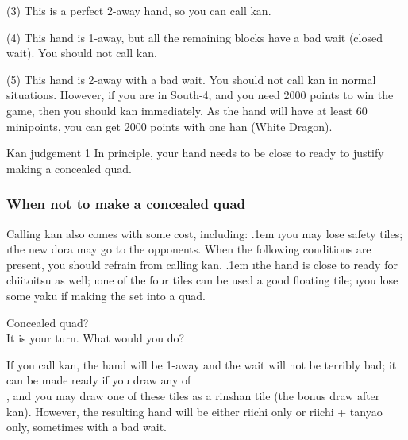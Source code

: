 \noindent (3) This is a perfect 2-away hand, so you can call {\jap kan}.

\noindent (4) This hand is 1-away, but all the remaining blocks have a bad wait (closed wait). You should not call {\jap kan}.

\noindent (5) This hand is 2-away with a bad wait. You should not call {\jap kan} in normal situations. However, if you are in South-4, and you need 2000 points to win the game, then you should {\jap kan} immediately. As the hand will have at least 60 minipoints, you can get 2000 points with one {\jap han} (White Dragon). 

\bigskip
\begin{itembox}[c]{{\jap Kan} judgement 1}
In principle, your hand needs to be close to ready to justify making a concealed quad. 
\end{itembox}

\subsubsection{When not to make a concealed quad}

Calling {\jap kan} also comes with some cost, including:
\bi \itemsep.1em
\i you may lose safety tiles;
\i the new {\jap dora} may go to the opponents.
\ei
When the following conditions are present, you should refrain from calling {\jap kan}.
\bi \itemsep.1em
\i the hand is close to ready for {\jap chiitoitsu} as well;
\i one of the four tiles can be used a good floating tile;
\i you lose some {\jap yaku} if making the set into a quad.
\ei

\bigskip
\begin{itembox}[r]{Concealed quad?}
\bp
{}\\
\ep{}
\vspace{-10pt}It is your turn. What would you do?
\end{itembox}
\noindent
If you call {\jap kan}, the hand will be 1-away and the wait will not be terribly bad; it can be made ready if you draw any of \\{\LARGE{}}, and you may draw one of these tiles as a {\jap rinshan} tile (the bonus draw after {\jap kan}). However, the resulting hand will be either riichi only or riichi + {\jap tanyao} only, sometimes with a bad wait. 

